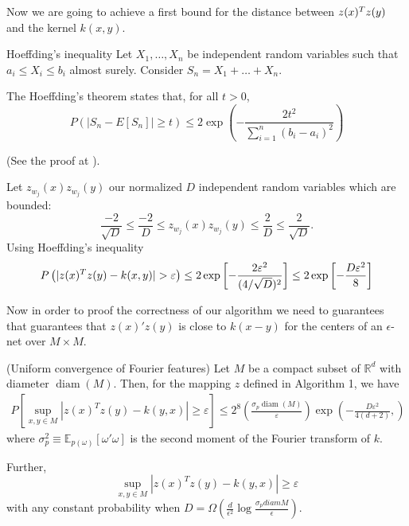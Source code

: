 Now we are going to achieve a first bound for the distance between $z(x)^T z(y)$ and the kernel $k(x,y)$. 

\begin{theorem}{Hoeffding's inequality}
    Let $X_1, \ldots, X_n$ be independent random variables
    such that $a_i \leq X_i \leq b_i$ almost surely.
    Consider $S_n = X_1 +  \ldots + X_n$.

    The Hoeffding's theorem states that, for all $t>0$,
    \begin{equation}
        P\left(
            |S_n - E[S_n]| \geq t
        \right)
        \leq 
        2 \exp \left(
            - \frac{2 t^2}{\sum_{i=1}^n (b_i -a_i)^2}
        \right)
    \end{equation}
\end{theorem}
(See the proof at \cite{Hoeffding1994}). 

Let $z_{w_j}(x)z_{w_j}(y)$ our  normalized $D$ independent random variables which are bounded: 
\begin{equation}
    \frac{-2}{\sqrt{D}} 
    \leq 
    \frac{-2}{D} 
    \leq z_{w_j}(x)z_{w_j}(y) 
    \leq  
    \frac{2}{D} 
    \leq 
    \frac{2}{\sqrt{D}}. 
\end{equation}
Using Hoeffding's inequality
 \begin{equation}
    \label{eq:firstBound}
    P\left(
        |z(x)^T z(y) - k(x,y)|
        > \varepsilon
    \right)
    \leq 
    2 
    \exp\left[
        - \frac{2\varepsilon^2}{(4/\sqrt{D})^2}
    \right]
    \leq
    2 
    \exp\left[
        - \frac{D\varepsilon^2}{8}
    \right]
 \end{equation}



Now in order to proof the correctness of our algorithm we need to guarantees that 
guarantees that $z(x)'z(y)$ is close to $k(x-y)$ 
for the centers of an $\epsilon$-net over $M \times M$.

\begin{claim}
    (Uniform convergence of Fourier features) 
    Let $M$ be a compact subset of $\mathbb{R}^d$ with diameter $\operatorname{diam}(M)$. Then, for the mapping $z$ defined in Algorithm 1, we have
    \begin{align}
        P \left[
            \sup_{x,y \in M} |z(x)^T z(y) - k(y,x)|
            \geq \varepsilon
        \right]
        \leq 
        2^8
        \left(
            \frac{\sigma_p \operatorname{diam}(M)}{\varepsilon}
        \right)
        \exp \left(
            - \frac{D \varepsilon^2}{4(d+2)},
        \right)
    \end{align}
    where $\sigma_p^2 \equiv \mathbb{E}_{p(\omega)}[\omega' \omega]$ is the second moment of the Fourier transform of $k$.

    Further, 
    $$
    \sup_{x,y \in M} |z(x)^T z(y) - k(y,x)|
    \geq \varepsilon
    $$
    with any constant probability when 
    $D = \Omega \left( 
        \frac{d}{\epsilon^2}
        \log{\frac{\sigma_p diam{M}}{\epsilon}}
    \right).$
\end{claim}


